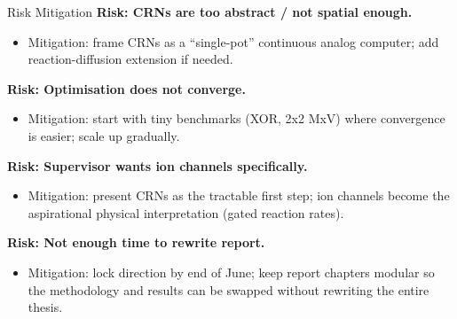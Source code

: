 \documentclass[aspectratio=169,11pt]{beamer}
\begin{document}
\begin{frame}{Risk Mitigation}
  \small
  \textbf{Risk: CRNs are too abstract / not spatial enough.}
  \begin{itemize}
    \item Mitigation: frame CRNs as a ``single-pot'' continuous analog computer; add reaction-diffusion extension if needed.
  \end{itemize}

  \vspace{0.1cm}
  \textbf{Risk: Optimisation does not converge.}
  \begin{itemize}
    \item Mitigation: start with tiny benchmarks (XOR, 2x2 MxV) where convergence is easier; scale up gradually.
  \end{itemize}

  \vspace{0.1cm}
  \textbf{Risk: Supervisor wants ion channels specifically.}
  \begin{itemize}
    \item Mitigation: present CRNs as the tractable first step; ion channels become the aspirational physical interpretation (gated reaction rates).
  \end{itemize}

  \vspace{0.1cm}
  \textbf{Risk: Not enough time to rewrite report.}
  \begin{itemize}
    \item Mitigation: lock direction by end of June; keep report chapters modular so the methodology and results can be swapped without rewriting the entire thesis.
  \end{itemize}
\end{frame}
\end{document}
